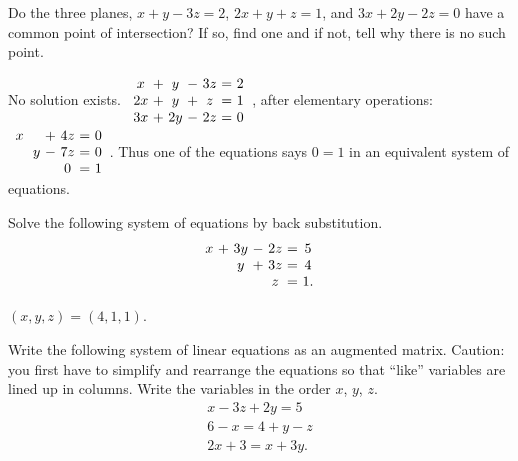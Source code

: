 \begin{enumialphparenastyle}
\begin{ex}
  Do the three planes, $x+y-3z=2$, $2x+y+z=1$, and $3x+2y-2z=0$ have a
  common point of intersection? If so, find one and if not, tell why
  there is no such point.
  \begin{sol}
    No solution exists. $
    \begin{array}{c@{~}c@{~}c@{~}c@{~}c@{~}c@{~}c}
      x &+& y &-& 3z &=& 2 \\
      2x &+& y &+& z &=& 1 \\
      3x &+& 2y &-& 2z &=& 0
    \end{array}
    $, after elementary operations: 
    $\begin{array}{c@{~}c@{~}c@{~}c@{~}c@{~}c@{~}c}
      x & &   &+& 4z &=& 0 \\
        & & y &-& 7z &=& 0 \\
        & &   & & 0 &=& 1
     \end{array}$.
    Thus one of the equations says $0=1$ in an equivalent system of
    equations.
  \end{sol}
\end{ex}

\begin{ex}
  Solve the following system of equations by back substitution.
  \begin{equation*}
    \begin{array}{c@{~}c@{~}c@{~}c@{~}c@{~}c@{~}c}
      x &+& 3y &-& 2z &=& 5 \\
        & & y  &+& 3z &=& 4 \\
        & &    & & z  &=& 1.
    \end{array}
  \end{equation*}

  \begin{sol}
    $(x,y,z) = (4,1,1)$.
  \end{sol}
\end{ex}

\begin{ex}
  Write the following system of linear equations as an augmented
  matrix. Caution: you first have to simplify and rearrange the
  equations so that ``like'' variables are lined up in columns. Write
  the variables in the order $x$, $y$, $z$.
  \begin{equation*}
    \begin{array}{c}
      x - 3z + 2y = 5 \\
      6 - x = 4 + y - z\\
      2x + 3 = x + 3y.
    \end{array}
  \end{equation*}


\end{ex}
\end{enumialphparenastyle}
